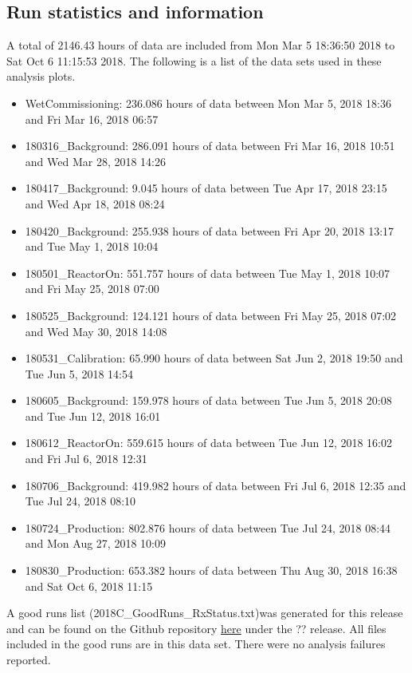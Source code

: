 \subsection{Run statistics and information}
A total of 2146.43 hours of data are included from Mon Mar  5 18:36:50 2018 to Sat Oct  6 11:15:53 2018. The following is a list of the data sets used in these analysis plots. 
\begin{itemize}
\item{WetCommissioning: 236.086 hours of data between Mon Mar 5, 2018 18:36 and Fri Mar 16, 2018 06:57}
\item{180316\_Background: 286.091 hours of data between Fri Mar 16, 2018 10:51 and Wed Mar 28, 2018 14:26}
\item{180417\_Background: 9.045 hours of data between Tue Apr 17, 2018 23:15 and Wed Apr 18, 2018 08:24}
\item{180420\_Background: 255.938 hours of data between Fri Apr 20, 2018 13:17 and Tue May 1, 2018 10:04}
\item{180501\_ReactorOn: 551.757 hours of data between Tue May 1, 2018 10:07 and Fri May 25, 2018 07:00}
\item{180525\_Background: 124.121 hours of data between Fri May 25, 2018 07:02 and Wed May 30, 2018 14:08}
\item{180531\_Calibration: 65.990 hours of data between Sat Jun 2, 2018 19:50 and Tue Jun 5, 2018 14:54}
\item{180605\_Background: 159.978 hours of data between Tue Jun 5, 2018 20:08 and Tue Jun 12, 2018 16:01}
\item{180612\_ReactorOn: 559.615 hours of data between Tue Jun 12, 2018 16:02 and Fri Jul 6, 2018 12:31}
\item{180706\_Background: 419.982 hours of data between Fri Jul 6, 2018 12:35 and Tue Jul 24, 2018 08:10}
\item{180724\_Production: 802.876 hours of data between Tue Jul 24, 2018 08:44 and Mon Aug 27, 2018 10:09}
\item{180830\_Production: 653.382 hours of data between Thu Aug 30, 2018 16:38 and Sat Oct 6, 2018 11:15}
\end{itemize}
A good runs list (2018C\_GoodRuns\_RxStatus.txt)was generated for this release and can be found on the Github repository  \href{https://github.com/PROSPECT-collaboration/PROSPECT2x_Analysis/tree/master/Analysis/AnalyzerConfig/2018C\_GoodRuns\_RxStatus.txt}{here} under the ?? release. All files included in the good runs are in this data set. There were no analysis failures reported.
